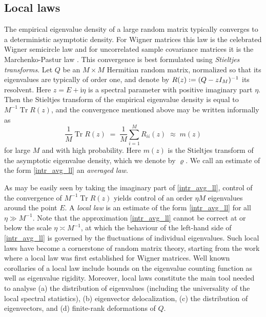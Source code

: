 \documentclass[11pt]{article} %
\numberwithin{equation}{section}
\numberwithin{figure}{section}
\theoremstyle{plain} %
\theoremstyle{definition} %
\newcommand{\ii}{\mathrm{i}}
\newcommand*{\deq}{\mathrel{\vcenter{\baselineskip0.65ex \lineskiplimit0pt \hbox{.}\hbox{.}}}=}
\DeclareMathOperator{\tr}{Tr}
\begin{document}
\subsection{Local laws}
The empirical eigenvalue density of a large random matrix typically converges to
a deterministic asymptotic density. For Wigner matrices this law is the celebrated Wigner semicircle law \cite{Wig} and for uncorrelated sample covariance matrices it is the Marchenko-Pastur law \cite{MP}. This convergence is best formulated using \emph{Stieltjes transforms}. Let $Q$ be an $M \times M$ Hermitian random matrix, normalized so that its eigenvalues are typically of order one, and denote by $R(z) \deq (Q - z I_M)^{-1}$ its resolvent. Here $z = E + \ii \eta$ is a spectral parameter with positive imaginary part $\eta$. Then the Stieltjes transform of the empirical eigenvalue density is equal to $M^{-1} \tr R(z)$, and the convergence mentioned above may be written informally as
\begin{equation} \label{intr_avg_ll}
\frac{1}{M} \tr R(z) \;=\; \frac{1}{M} \sum_{i = 1}^M R_{ii}(z) \;\approx\; m(z)
\end{equation}
for large $M$ and with high probability. Here $m(z)$ is the Stieltjes transform of the asymptotic eigenvalue density, which we denote by $\varrho$. We call an estimate of the form \eqref{intr_avg_ll} an \emph{averaged law}.

As may be easily seen by taking the imaginary part of \eqref{intr_avg_ll}, control of the convergence of $M^{-1} \tr R(z)$ yields control of an order $\eta M$ eigenvalues around the point $E$. A \emph{local law} is an estimate of the form \eqref{intr_avg_ll} for all $\eta \gg M^{-1}$. Note that the approximation \eqref{intr_avg_ll} cannot be correct at or below the scale $\eta \asymp M^{-1}$, at which the behaviour of the left-hand side of \eqref{intr_avg_ll} is governed by the fluctuations of individual eigenvalues. Such local laws have become a cornerstone of random matrix theory, starting from the work \cite{ESY2} where a local law was first established for Wigner matrices. Well known corollaries of a local law include bounds on the eigenvalue counting function as well as eigenvalue rigidity.  Moreover, local laws constitute the main tool needed to analyse (a) the distribution of eigenvalues (including the universality of the local spectral statistics), (b) eigenvector delocalization, (c) the distribution of eigenvectors, and (d) finite-rank deformations of $Q$.
\end{document}
